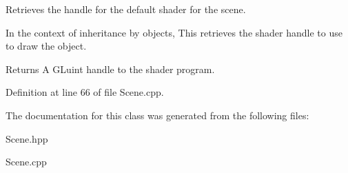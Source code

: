 Retrieves the handle for the default shader for the scene. 

In the context of inheritance by objects, This retrieves the shader handle to use to draw the object.

\begin{DoxyReturn}{Returns}
A G\-Luint handle to the shader program. 
\end{DoxyReturn}


Definition at line 66 of file Scene.\-cpp.



The documentation for this class was generated from the following files\-:\begin{DoxyCompactItemize}
\item 
Scene.\-hpp\item 
Scene.\-cpp\end{DoxyCompactItemize}
